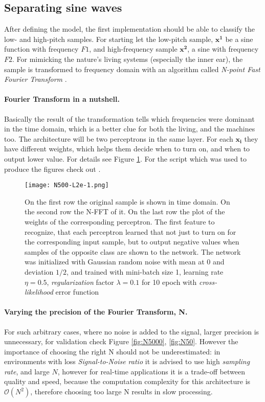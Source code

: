\subsection{Separating sine waves}
After defining the model, the first implementation should be able to classify the low- and high-pitch samples. For starting let the low-pitch sample, $\mathbf{x^1}$ be a sine function with frequency $F1$, and high-frequency sample $\mathbf{x^2}$, a sine with frequency $F2$. 
For mimicking the nature's living systems (especially the inner ear), the sample is transformed to frequency domain with an algorithm called \emph{N-point Fast Fourier Transform} \cite{welch1967use}. 
\paragraph{Fourier Transform in a nutshell.} Basically the result of the transformation tells which frequencies were dominant in the time domain, which is a better clue for both the living, and the machines too. 
The architecture will be two perceptrons in the same layer. 
For each $\mathbf{x_i}$ they have different weights, which helps them decide when to turn on, and when to output lower value. 
For details see Figure \ref{fig:N500}. 
For the script which was used to produce the figures check out \cite{DV}.

\begin{figure}
	\centering
	\texttt{[image: N500-L2e-1.png]}
	\caption{On the first row the original sample is shown in time domain.
	 On the second row the N-FFT of it. On the last row the plot of the 
	 weights of the corresponding perceptron. 
	 The first feature to 
	 recognize, that each perceptron learned that not just to turn on for 
	 the corresponding input sample, but to output negative values when 
	 samples of the opposite class are shown to the network. 
	 The network 
	 was initialized with Gaussian random noise with mean at 0 and 
	 deviation $1/2$, and trained with mini-batch size 1, learning rate $
	 \eta=0.5$, \emph{regularization} factor $\lambda=0.1$ for 10 epoch 
	 with \emph{cross-likelihood} error function}
	
	\label{fig:N500}
\end{figure}

\paragraph{Varying the precision of the Fourier Transform, N.}
For such arbitrary cases, where no noise is added to the signal, larger precision is unnecessary, for validation check Figure \ref{fig:N5000}, \ref{fig:N50}. However the importance of choosing the right N should not be underestimated: in environments with loss \emph{Signal-to-Noise ratio} it is advised to use high \emph{sampling rate}, and large $N$, however for real-time applications it is a trade-off between quality and speed, because the computation complexity for this architecture is $\mathcal{O}(N^2)$, therefore choosing too large N results in slow processing.

